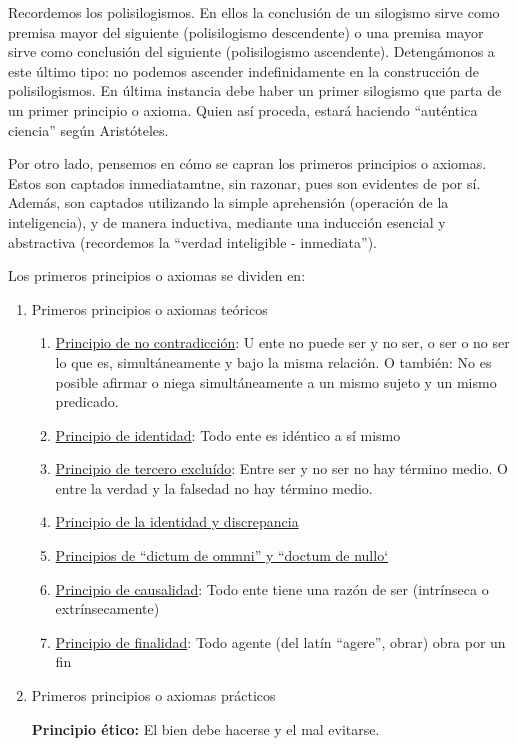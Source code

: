 \documentclass{article}
\begin{document}
\begin{center}
\end{center}
Recordemos los polisilogismos. En ellos la conclusión de un silogismo sirve como premisa mayor del siguiente (polisilogismo descendente) o una premisa mayor sirve como conclusión del siguiente (polisilogismo ascendente). Detengámonos a este último tipo: no podemos ascender indefinidamente en la construcción de polisilogismos. En última instancia debe haber un primer silogismo que parta de un primer principio o axioma. Quien así proceda, estará haciendo ``auténtica ciencia'' según Aristóteles.
\par Por otro lado, pensemos en cómo se capran los primeros principios o axiomas. Estos son captados inmediatamtne, sin razonar, pues son evidentes de por sí. Además, son captados utilizando la simple aprehensión (operación de la inteligencia), y de manera inductiva, mediante una inducción esencial y abstractiva (recordemos la ``verdad inteligible - inmediata'').

\par Los primeros principios o axiomas se dividen en:

\begin{enumerate}
\item Primeros principios o axiomas teóricos
    \begin{enumerate}
        \item \underline{Principio de no contradicción}: U ente no puede ser y no ser, o ser o no ser lo que es, simultáneamente y bajo la misma relación. O también: No es posible afirmar o niega simultáneamente a un mismo sujeto y un mismo predicado.
        \item \underline{Principio de identidad}: Todo ente es idéntico a sí mismo
        \item \underline{Principio de tercero excluído}: Entre ser y no ser no hay término medio. O entre la verdad y la falsedad no hay término medio.
        \item \underline{Principio de la identidad y discrepancia}
        \item \underline{Principios de ``dictum de ommni'' y ``doctum de nullo`}
        \item \underline{Principio de causalidad}: Todo ente tiene una razón de ser (intrínseca o extrínsecamente)
        \item \underline{Principio de finalidad}: Todo agente (del latín ``agere'', obrar) obra por un fin
    \end{enumerate}
\item Primeros principios o axiomas prácticos

\par \textbf{Principio ético:} El bien debe hacerse y el mal evitarse.
\end{enumerate}
\end{document}
